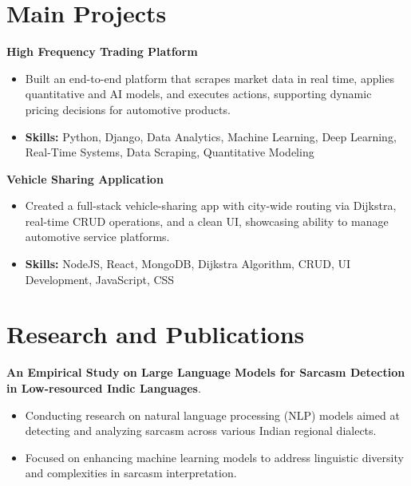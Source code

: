 \documentclass[a4paper,11pt]{article}
\begin{document}
\section{\textbf{Main Projects}}

\vspace{1mm}
  \textbf{High Frequency Trading Platform  }
\vspace{-1.5mm} %
\begin{itemize}
  \item Built an end-to-end platform that scrapes market data in real time, applies quantitative and AI models, and executes actions, supporting dynamic pricing decisions for automotive products.
\vspace{-3mm}
  \item \textbf{Skills:} Python, Django, Data Analytics, Machine Learning, Deep Learning, Real-Time Systems, Data Scraping, Quantitative Modeling
\end{itemize}


\vspace{1mm}
   \textbf{Vehicle Sharing Application }
\vspace{-1.5mm} %
\begin{itemize}
  \item Created a full-stack vehicle-sharing app with city-wide routing via Dijkstra, real-time CRUD operations, and a clean UI, showcasing ability to manage automotive service platforms.
\vspace{-3mm}
  \item \textbf{Skills:} NodeJS, React, MongoDB, Dijkstra Algorithm, CRUD, UI Development, JavaScript, CSS
\end{itemize}



\section{\textbf{Research and Publications} \hfill }
\vspace{1mm}
  \textbf{An Empirical Study on Large Language Models for Sarcasm Detection in Low-resourced Indic Languages}.
\vspace{-1mm} %
\begin{itemize}
  \item Conducting research on natural language processing (NLP) models aimed at detecting and analyzing sarcasm across various Indian regional dialects.
\vspace{-3mm}
  \item Focused on enhancing machine learning models to address linguistic diversity and complexities in sarcasm interpretation.
\end{itemize}
\end{document}
